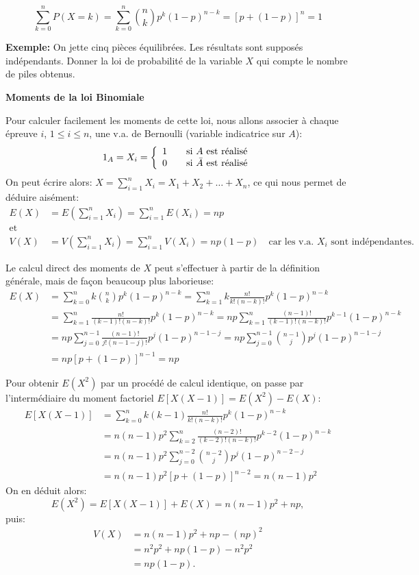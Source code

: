 \documentclass[]{book}
\theoremstyle{magentacolor}
\theoremstyle{proprie}
\theoremstyle{exstyle}
\theoremstyle{exostyle}
\theoremstyle{definition}
\theoremstyle{definition}
\theoremstyle{definition}
\theoremstyle{remark}
\begin{document}
\[{\sum_{k=0}^nP(X=k)=\sum_{k=0}^n\binom{n}{k} p^{k}(1-p)^{n-k}=[p+(1-p)]^n=1}\]

\textbf{Exemple:} On jette cinq pièces équilibrées. Les résultats sont supposés
indépendants. Donner la loi de probabilité de la variable \(X\) qui compte
le nombre de piles obtenus.

\textbf{Moments de la loi Binomiale}

Pour calculer facilement les moments de cette loi, nous allons associer
à chaque épreuve \(i\), \(1\leq i \leq n\), une v.a. de Bernoulli (variable
indicatrice sur \(A\)): \[{1}_A=X_i = \left\{ 
\begin{array}{l l}
 1 & \quad \text{si $A$ est réalisé}\\
 0 & \quad \text{si $\bar{A}$ est réalisé}\\ 
  \end{array} \right.\] On peut écrire alors:
\(X=\sum_{i=1}^nX_i=X_1+X_2+\ldots+X_n\), ce qui nous permet de déduire
aisément: \[\begin{aligned}
    E(X)&=E\left(\sum_{i=1}^nX_i\right)=\sum_{i=1}^nE(X_i)=np \\
    \text{et} \nonumber \\
    V(X)&=V\left(\sum_{i=1}^nX_i\right)=\sum_{i=1}^nV(X_i)=np(1-p) \quad \text{car les v.a. $X_i$ sont indépendantes.}
  \end{aligned}\]

Le calcul direct des moments de \(X\) peut s'effectuer à partir de la
définition générale, mais de façon beaucoup plus laborieuse:
\[\begin{aligned}
 E(X)&= \sum_{k=0}^nk \binom{n}{k} p^{k}(1-p)^{n-k}=\sum_{k=1}^nk \frac{n!}{k!(n-k)!} p^{k}(1-p)^{n-k} \\
 &= \sum_{k=1}^n\frac{n!}{(k-1)!(n-k)!} p^{k}(1-p)^{n-k}= np \sum_{k=1}^n\frac{(n-1)!}{(k-1)!(n-k)!} p^{k-1}(1-p)^{n-k} \\ 
 &= np \sum_{j=0}^{n-1}\frac{(n-1)!}{j!(n-1-j)!}p^j (1-p)^{n-1-j} =np \sum_{j=0}^{n-1}\binom{n-1}{j} p^{j}(1-p)^{n-1-j} \\
 &= np [p+(1-p)]^{n-1}=np
 \end{aligned}\]

Pour obtenir \(E(X^2)\) par un procédé de calcul identique, on passe par
l'intermédiaire du moment factoriel \(E[X(X-1)]=E(X^2)-E(X)\):
\[\begin{aligned}
  E[X(X-1)]&= \sum_{k=0}^nk(k-1) \frac{n!}{k!(n-k)!} p^{k}(1-p)^{n-k} \\ 
  &= n(n-1)p^2 \sum_{k=2}^{n}\frac{(n-2)!}{(k-2)!(n-k)!} p^{k-2}(1-p)^{n-k} \\ &= n(n-1)p^2 \sum_{j=0}^{n-2}\binom{n-2}{j} p^{j}(1-p)^{n-2-j} \\
  &= n(n-1)p^2[p+(1-p)]^{n-2}= n(n-1)p^2
   \end{aligned}\] On en déduit alors:
\[E(X^2)=E[X(X-1)]+E(X)= n(n-1)p^2+np,\] puis: \[\begin{aligned}
   V(X)&=n(n-1)p^2+np-(np)^2 \\ &=n^2p^2+np(1-p)-n^2p^2 \\ &=np(1-p).
  \end{aligned}\]
\end{document}
